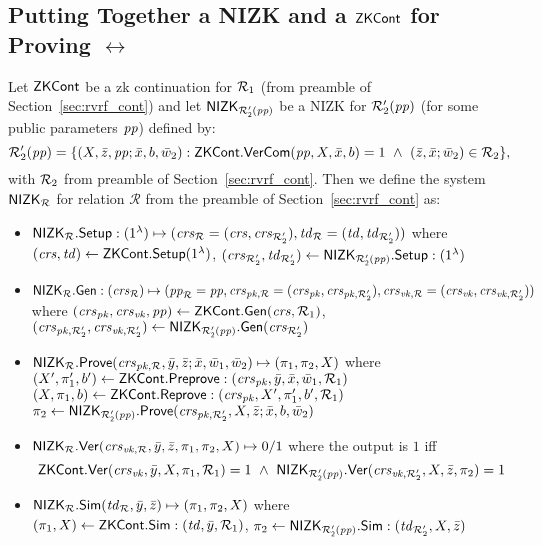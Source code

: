 \subsection{Putting Together a NIZK and a $\ZKCont$  for Proving $\rel$}
Let $\ZKCont$ be a zk continuation for $\relone$ (from preamble of Section~\ref{sec:rvrf_cont}) and 
let $\nizktwo$ be a NIZK for $\reltwo'(\pp)$ (for some public parameters $\pp$) defined by:
$$\reltwo'(\pp) = \{(X, \barz, \pp; \barx, b, \baromega_2): \ZKCont.\VerifyCom(\pp, X, \barx, b) =1 \ \wedge \ (\barz, \barx; \baromega_2) \in \reltwo \},$$
\noindent with $\reltwo$ from preamble of Section~\ref{sec:rvrf_cont}. Then we define the system $\nizkR$ for relation $\mathcal{R}$ 
from the preamble of Section~\ref{sec:rvrf_cont} as:
\begin{itemize}
\item $\nizkR.\Setup: (1^{\lambda}) \mapsto (\crsR = (\crs,\crstwo), \twR = (\tw, \twtwo))$ where \\
$(\crs, \tw) \leftarrow \ZKCont.\Setup(1^{\lambda})$, $(\crstwo, \twtwo) \leftarrow \nizktwo.\Setup: (1^{\lambda})$

\item $\nizkR.\Gen: (\crsR) \mapsto (\ppR = \pp, \crspkR = (\crspk,\crspktwo), \crsvkR = (\crsvk,\crsvktwo))$ where 
$(\crspk, \crsvk, \pp) \leftarrow \ZKCont.\Gen(\crs, \relone)$, \\ $(\crspktwo, \crsvktwo) \leftarrow \nizktwo.\Gen(\crstwo)$ 

\item $\nizkR.\Prove(\crspkR,\bary, \barz; \barx, \baromega_1, \baromega_2 ) \mapsto (\pi_1, \pi_2, X)$ where \\
$(X', \pi'_1, b')\leftarrow \ZKCont.\Preprove:(\crspk, \bar{y}, \bar{x}, \baromega_1, \relone)$ \\
$(X, \pi_1, b) \leftarrow \ZKCont.\Reprove: (\crspk, X', \pi_1', b', \relone)$ \\
$ \pi_2 \leftarrow \nizktwo.\Prove(\crspktwo, X, \barz; \barx, b, \baromega_2)$ 

\item $\nizkR.\Verify(\crsvkR,\bary, \barz, \pi_1, \pi_2, X) \mapsto 0/1$ where the output is $1$ iff 
$$\ZKCont.\Verify(\crsvk, \bar{y}, X, \pi_1, \relone) = 1 \  \wedge \ \nizktwo.\Verify(\crsvktwo, X, \barz, \pi_2) =1$$

\item $\nizkR.\Sim(\twR, \bary, \barz) \mapsto (\pi_1, \pi_2, X)$ where \\
$(\pi_1, X) \leftarrow \ZKCont.\Sim: (\tw, \bary, \relone)$, $\pi_2 \leftarrow \nizktwo.\Sim: (\twtwo, X, \barz)$ 
 \end{itemize}
 
